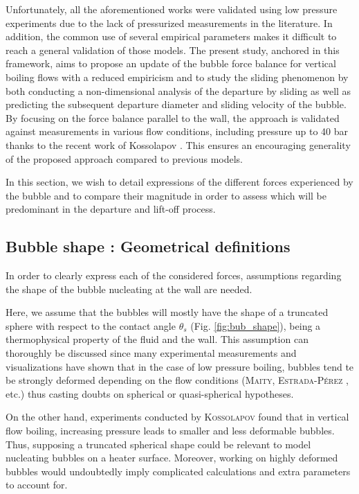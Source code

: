 Unfortunately, all the aforementioned works were validated using low pressure experiments due to the lack of pressurized measurements in the literature. In addition, the common use of several empirical parameters makes it difficult to reach a general validation of those models. The present study, anchored in this framework, aims to propose an update of the bubble force balance for vertical boiling flows with a reduced empiricism and to study the sliding phenomenon by both conducting a non-dimensional analysis of the departure by sliding as well as predicting the subsequent departure diameter and sliding velocity of the bubble. By focusing on the force balance parallel to the wall, the approach is validated against measurements in various flow conditions, including pressure up to 40 bar thanks to the recent work of Kossolapov \cite{kossolapov_experimental_2021}. This ensures an encouraging generality of the proposed approach compared to previous models.


In this section, we wish to detail expressions of the different forces experienced by the bubble and to compare their magnitude in order to assess which will be predominant in the departure and lift-off process.

\subsection{Bubble shape : Geometrical definitions}

\label{subsec:geom_bub}

In order to clearly express each of the considered forces, assumptions regarding the shape of the bubble nucleating at the wall are needed.

\npar

Here, we assume that the bubbles will mostly have the shape of a truncated sphere with respect to the contact angle $\theta_{s}$ (Fig. \ref{fig:bub_shape}), being a thermophysical property of the fluid and the  wall. This assumption can thoroughly be discussed since many experimental measurements and visualizations have shown that in the case of low pressure boiling, bubbles tend te be strongly deformed depending on the flow conditions (\textsc{Maity}, \textsc{Estrada-Pérez} \etal, etc.) thus casting doubts on spherical or quasi-spherical hypotheses.

\npar
On the other hand, experiments conducted by \textsc{Kossolapov} found that in vertical flow boiling, increasing pressure leads to smaller and less deformable bubbles. Thus, supposing a truncated spherical shape could be relevant to model nucleating bubbles on a heater surface. Moreover, working on highly deformed bubbles would undoubtedly imply complicated calculations and extra parameters to account for.

